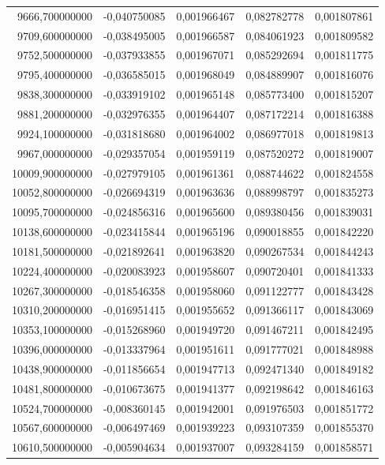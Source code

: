 \begin{longtable}{rrrrr}
9666,700000000 & -0,040750085 & 0,001966467 & 0,082782778 & 0,001807861\\
9709,600000000 & -0,038495005 & 0,001966587 & 0,084061923 & 0,001809582\\
9752,500000000 & -0,037933855 & 0,001967071 & 0,085292694 & 0,001811775\\
9795,400000000 & -0,036585015 & 0,001968049 & 0,084889907 & 0,001816076\\
9838,300000000 & -0,033919102 & 0,001965148 & 0,085773400 & 0,001815207\\
9881,200000000 & -0,032976355 & 0,001964407 & 0,087172214 & 0,001816388\\
9924,100000000 & -0,031818680 & 0,001964002 & 0,086977018 & 0,001819813\\
9967,000000000 & -0,029357054 & 0,001959119 & 0,087520272 & 0,001819007\\
10009,900000000 & -0,027979105 & 0,001961361 & 0,088744622 & 0,001824558\\
10052,800000000 & -0,026694319 & 0,001963636 & 0,088998797 & 0,001835273\\
10095,700000000 & -0,024856316 & 0,001965600 & 0,089380456 & 0,001839031\\
10138,600000000 & -0,023415844 & 0,001965196 & 0,090018855 & 0,001842220\\
10181,500000000 & -0,021892641 & 0,001963820 & 0,090267534 & 0,001844243\\
10224,400000000 & -0,020083923 & 0,001958607 & 0,090720401 & 0,001841333\\
10267,300000000 & -0,018546358 & 0,001958060 & 0,091122777 & 0,001843428\\
10310,200000000 & -0,016951415 & 0,001955652 & 0,091366117 & 0,001843069\\
10353,100000000 & -0,015268960 & 0,001949720 & 0,091467211 & 0,001842495\\
10396,000000000 & -0,013337964 & 0,001951611 & 0,091777021 & 0,001848988\\
10438,900000000 & -0,011856654 & 0,001947713 & 0,092471340 & 0,001849182\\
10481,800000000 & -0,010673675 & 0,001941377 & 0,092198642 & 0,001846163\\
10524,700000000 & -0,008360145 & 0,001942001 & 0,091976503 & 0,001851772\\
10567,600000000 & -0,006497469 & 0,001939223 & 0,093107359 & 0,001855370\\
10610,500000000 & -0,005904634 & 0,001937007 & 0,093284159 & 0,001858571\\

\end{longtable}
